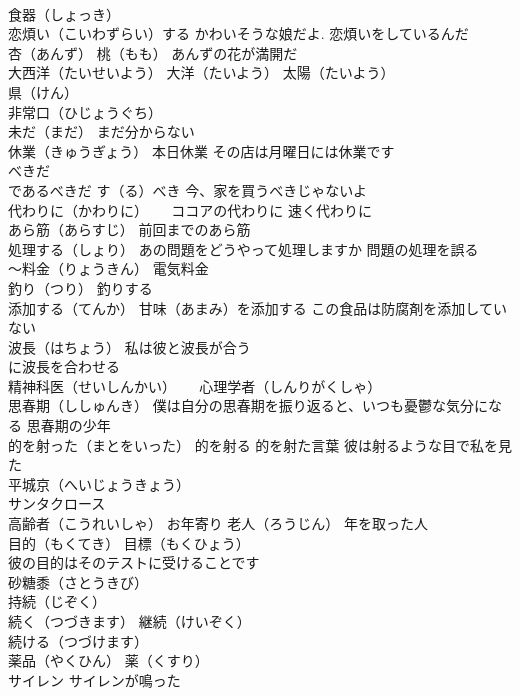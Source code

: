 \documentclass[8pt]{extreport}
\begin{document}
\begin{CJK}{UTF8}{min}
\\	食器（しょっき）
\\	恋煩い（こいわずらい）する かわいそうな娘だよ. 恋煩いをしているんだ
\\	杏（あんず） 桃（もも） あんずの花が満開だ
\\	大西洋（たいせいよう） 大洋（たいよう） 太陽（たいよう）　
\\	県（けん）
\\	非常口（ひじょうぐち）
\\	未だ（まだ） まだ分からない
\\	休業（きゅうぎょう） 本日休業 その店は月曜日には休業です
\\	べきだ 
\\	であるべきだ す（る）べき 今、家を買うべきじゃないよ
\\	代わりに（かわりに） 　 ココアの代わりに 速く代わりに
\\	あら筋（あらすじ） 前回までのあら筋
\\	処理する（しょり） あの問題をどうやって処理しますか 問題の処理を誤る
\\	～料金（りょうきん） 電気料金
\\	釣り（つり） 釣りする
\\	添加する（てんか） 甘味（あまみ）を添加する この食品は防腐剤を添加していない
\\	波長（はちょう） 私は彼と波長が合う 
\\	に波長を合わせる
\\	精神科医（せいしんかい） 　 心理学者（しんりがくしゃ）
\\	思春期（ししゅんき） 僕は自分の思春期を振り返ると、いつも憂鬱な気分になる 思春期の少年
\\	的を射った（まとをいった） 的を射る 的を射た言葉 彼は射るような目で私を見た
\\	平城京（へいじょうきょう）
\\	サンタクロース
\\	高齢者（こうれいしゃ） お年寄り 老人（ろうじん） 年を取った人
\\	目的（もくてき） 目標（もくひょう）
\\	彼の目的はそのテストに受けることです
\\	砂糖黍（さとうきび）
\\	持続（じぞく） 
\\	続く（つづきます） 継続（けいぞく） 
\\	続ける（つづけます）
\\	薬品（やくひん） 薬（くすり）
\\	サイレン サイレンが鳴った

\end{CJK}
\end{document}
